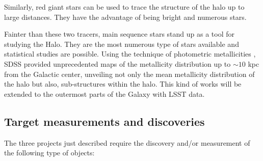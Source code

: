 Similarly, red giant stars can be used to trace the structure of the halo up to large
distances. They have the advantage 
of being bright and numerous stars.

Fainter than these two tracers, main sequence stars stand up as a tool for studying
the Halo. They are the most numerous type of stars available and statistical studies 
are possible. Using the technique of photometric metallicities \citep{ivezic08}, 
SDSS provided unprecedented maps of the metallicity distribution up to  $\sim 10$ 
kpc from the Galactic center, unveiling not only the mean metallicity distribution 
of the halo but also, sub-structures within the halo. This kind of works will be extended
to the outermost parts of the Galaxy with LSST data.



\subsection{Target measurements and discoveries}
\label{sec:\secname:MW_Halo_targets}

The three projects just described require the discovery and/or measurement of the following 
type of objects:

